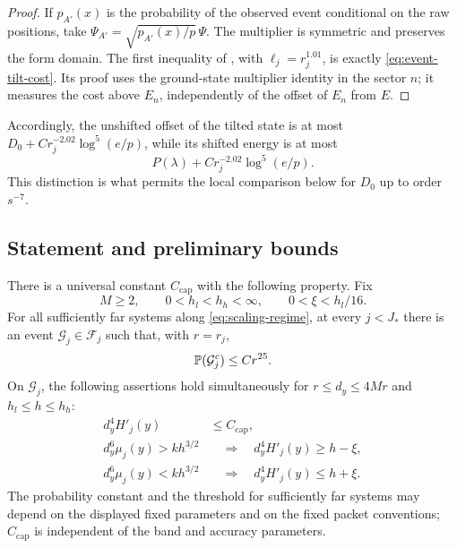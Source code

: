 \begin{proof}
If $p_{A'}(x)$ is the probability of the observed event conditional on the
raw positions, take
$\Psi_{A'}=\sqrt{p_{A'}(x)/p}\,\Psi$.
The multiplier is symmetric and preserves the form domain.  The first
inequality of \cite[\FEventTilt]{Foundation}, with
$\ell_j=r_j^{1.01}$, is exactly \cref{eq:event-tilt-cost}.
Its proof uses the ground-state multiplier identity in the sector $n$;
it measures the cost above $E_n$, independently of the offset of $E_n$
from $E$.
\end{proof}

Accordingly, the unshifted offset of the tilted state is at most
$D_0+C r_j^{-2.02}\log^5(e/p)$, while its shifted energy is at most
\begin{equation}
 P(\lambda)+C r_j^{-2.02}\log^5(e/p).
 \label{eq:shifted-tilt-cost}
\end{equation}
This distinction is what permits the local comparison below for
$D_0$ up to order $s^{-7}$.

\subsection{Statement and preliminary bounds}

\begin{proposition}
\label{prop:inverse-comparison}
There is a universal constant $C_{\mathrm{cap}}$ with the following property.
Fix
\[
 M\geq2,\qquad 0<h_l<h_h<\infty,\qquad 0<\xi<h_l/16.
\]
For all sufficiently far systems along \cref{eq:scaling-regime}, at every
$j<J_*$ there is an event $\mathcal G_j\in\mathcal F_j$ such that, with
$r=r_j$,
\[
 \mathbb P(\mathcal G_j^c)\leq Cr^{25}.
\]
On $\mathcal G_j$, the following assertions hold simultaneously for
$r\leq d_y\leq4Mr$ and $h_l\leq h\leq h_h$:
\begin{equation}
 \begin{split}
 d_y^4H'_j(y)&\leq C_{\mathrm{cap}},\\
 d_y^6\mu_j(y)>kh^{3/2}
       &\quad\Longrightarrow\quad d_y^4H'_j(y)\geq h-\xi,\\
 d_y^6\mu_j(y)<kh^{3/2}
       &\quad\Longrightarrow\quad d_y^4H'_j(y)\leq h+\xi.
 \end{split}
 \label{eq:inverse-comparison}
\end{equation}
The probability constant and the threshold for sufficiently far systems
may depend on the displayed fixed parameters and on the fixed packet
conventions; $C_{\mathrm{cap}}$ is independent of the band and accuracy
parameters.
\end{proposition}

